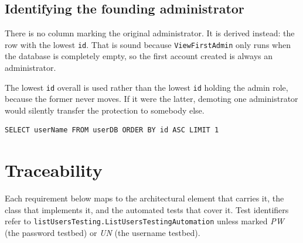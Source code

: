 \documentclass[11pt,a4paper]{article}
\newcommand{\cls}[1]{\texttt{#1}}
\begin{document}
\subsection{Identifying the founding administrator}

There is no column marking the original administrator. It is derived instead: the row with
the lowest \texttt{id}. That is sound because \cls{ViewFirstAdmin} only runs when the
database is completely empty, so the first account created is always an administrator.

The lowest \texttt{id} overall is used rather than the lowest \texttt{id} holding the admin
role, because the former never moves. If it were the latter, demoting one administrator
would silently transfer the protection to somebody else.

\begin{lstlisting}[style=sql,caption={Identifying the founding administrator}]
SELECT userName FROM userDB ORDER BY id ASC LIMIT 1
\end{lstlisting}

\newpage
\section{Traceability}
\label{sec:trace}

Each requirement below maps to the architectural element that carries it, the class that
implements it, and the automated tests that cover it. Test identifiers refer to
\cls{listUsersTesting.ListUsersTestingAutomation} unless marked \textit{PW} (the password
testbed) or \textit{UN} (the username testbed).
\end{document}
